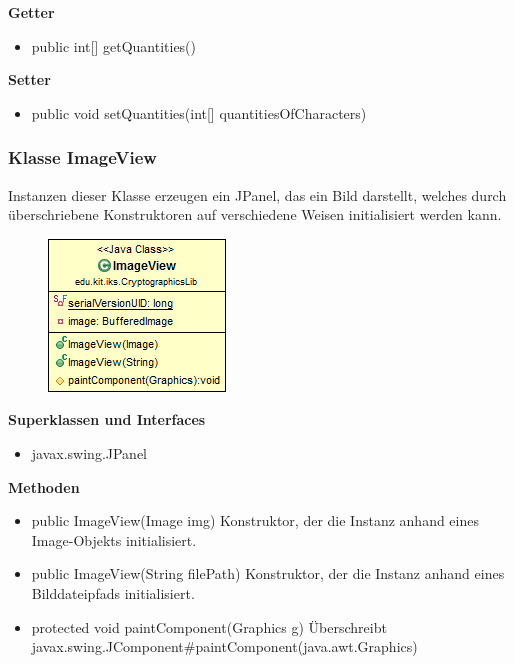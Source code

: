 \documentclass{article}
\begin{document}
      \textbf{Getter}
      \begin{itemize}
		\item public int[] getQuantities()
      \end{itemize}
      
      \textbf{Setter}
      \begin{itemize}
        \item public void setQuantities(int[] quantitiesOfCharacters)
      \end{itemize}
	
	\subsubsection{Klasse ImageView}
	  Instanzen dieser Klasse erzeugen ein JPanel, das ein Bild darstellt, welches
	  durch überschriebene Konstruktoren auf verschiedene Weisen initialisiert werden kann. 
	
      \begin{figure}[H]
        \centering
        \includegraphics{resources/edu-kit-iks-CryptographicsLib-ImageView}
      \end{figure}
	
      \textbf{Superklassen und Interfaces}
      \begin{itemize}
        \item javax.swing.JPanel
      \end{itemize}
	
      \textbf{Methoden}
      \begin{itemize}
        \item public ImageView(Image img) \newline
          Konstruktor, der die Instanz anhand eines Image-Objekts initialisiert.
        \item public ImageView(String filePath) \newline
          Konstruktor, der die Instanz anhand eines Bilddateipfads initialisiert.
        \item protected void paintComponent(Graphics g) \newline
          Überschreibt javax.swing.JComponent\#paintComponent(java.awt.Graphics)
      \end{itemize}
      
\end{document}
